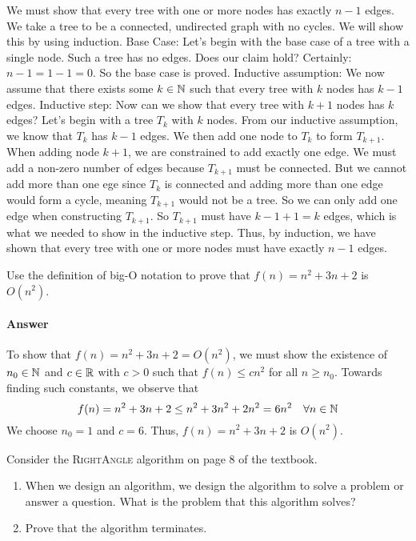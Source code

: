 \documentclass{article}
\begin{document}
We must show that every tree with one or more nodes has exactly $n-1$ edges.
We take a tree to be a connected, undirected graph with no cycles.
We will show this by using induction. \parspace
Base Case: Let's begin with the base case of a tree with a single node.
Such a tree has no edges.
Does our claim hold?
Certainly: $n-1 = 1-1 = 0$.
So the base case is proved. \parspace
Inductive assumption: We now assume that there exists some $k \in {\mathbb N}$ such that every tree with $k$ nodes has $k-1$ edges. \parspace
Inductive step: Now can we show that every tree with $k+1$ nodes has $k$ edges?
Let's begin with a tree $T_k$ with $k$ nodes.
From our inductive assumption, we know that $T_k$ has $k-1$ edges.
We then add one node to $T_k$ to form $T_{k+1}$. \parspace
When adding node $k+1$, we are constrained to add exactly one edge.
We must add a non-zero number of edges because $T_{k+1}$ must be connected.
But we cannot add more than one ege since $T_k$ is connected and adding more than one edge would form a cycle, meaning $T_{k+1}$ would not be a tree.
So we can only add one edge when constructing $T_{k+1}$.
So $T_{k+1}$ must have $k-1+1=k$ edges, which is what we needed to show in the inductive step. \parspace
Thus, by induction, we have shown that every tree with one or more nodes must have exactly $n-1$ edges.




\nextprob
Use the definition of big-O notation to prove that $f(n)=n^2 + 3n +2$ is
$O(n^2)$.

\paragraph{Answer}


To show that $f(n) = n^2 + 3n + 2 = O(n^2)$, we must show the existence of $n_0 \in {\mathbb N}$ and $c \in {\mathbb R}$ with $ c > 0$ such that $f(n) \leq c n^2$  for all $n \geq n_0$.
Towards finding such constants, we observe that
$$ f(n) = n^2 + 3n + 2 \leq n^2 + 3n^2 + 2n^2 = 6n^2 \hspace{1em} \forall n \in {\mathbb N} $$
We choose $n_0 = 1$ and $c = 6$.
Thus, $f(n) = n^2 + 3n + 2 $ is $O(n^2)$.




\nextprob
Consider the \textsc{RightAngle} algorithm on page 8 of the textbook.
\begin{enumerate}
    \item When we design an algorithm, we design the algorithm to solve a
        problem or answer a question.  What is the problem that this algorithm
        solves?
    \item Prove that the algorithm terminates.
\end{enumerate}
\end{document}
